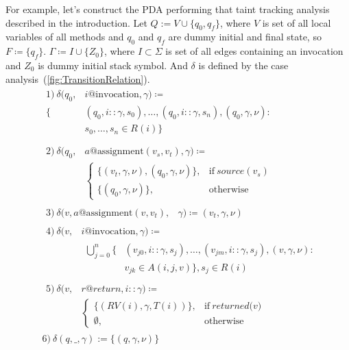 For example, let's construct the PDA performing that taint tracking analysis described in the introduction.
Let $Q := V \cup \{q_0, q_f\}$, where $V$ is set of all local variables of all methods and $q_0$ and $q_f$ are dummy initial and final state, so $F \coloneqq \{q_f\}$.
$\Gamma \coloneqq I \cup \{Z_0\}$, where $I \subset \Sigma$ is set of all edges containing an invocation and $Z_0$ is dummy initial stack symbol.
And $\delta$ is defined by the case analysis~(\ref{fig:TransitionRelation}).
\begin{equation}
	\label{fig:TransitionRelation}
	\begin{split}
		&\begin{split}
			1)\ \delta(q_0, & i@\textrm{invocation}, \gamma) \coloneqq \\
			\{& (q_0, i::\gamma, s_0), \ldots, (q_0, i::\gamma, s_n), (q_0, \gamma, \nu): \\
			& s_0, \ldots, s_n \in R(i)\} \\
		\end{split} \\
		&\begin{split}
			2)\ \delta(q_0, & a@\textrm{assignment} (v_s, v_t), \gamma) \coloneqq \\
			&\begin{cases}
				\{(v_t, \gamma, \nu), (q_0, \gamma, \nu)\},& \textrm{if}\ \textit{source}(v_s) \\
				\{(q_0, \gamma, \nu)\},& \textrm{otherwise}
			\end{cases}
		\end{split} \\
		&\begin{split}
			3)\ \delta(v, a@\textrm{assignment}(v, v_t), & \gamma) \coloneqq {(v_t, \gamma, \nu)}
		\end{split} \\
		&\begin{split}
			4)\ \delta(v, & i@\textrm{invocation}, \gamma) \coloneqq \\
			&\begin{split}
				\bigcup_{j=0}^{n} \{&(v_{j0}, i::\gamma, s_j), \ldots, (v_{jm}, i::\gamma, s_j), (v, \gamma, \nu): \\
				& v_{jk} \in A(i, j, v)\}, s_j \in R(i)
			\end{split}
		\end{split} \\
		&\begin{split}
			5)\ \delta(v, & r@return, i::\gamma) \coloneqq \\
			&\begin{cases}
				\{(RV(i), \gamma, T(i))\},& \textrm{if}\ \textit{returned(v)} \\
				\emptyset, & \textrm{otherwise}
			\end{cases}
		\end{split} \\
		& 6)\ \delta(q, \_, \gamma) := \{(q, \gamma, \nu)\}
	\end{split}
\end{equation}
